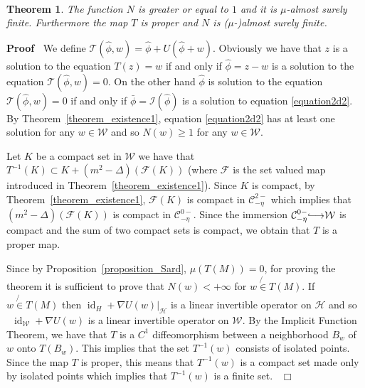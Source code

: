 \documentclass[a4paper,10pt]{article}
\newcommand{\longhookrightarrow}{{\lhook\joinrel\relbar\joinrel\rightarrow}}
\newcommand{\nobracket}{}
\newcommand{\tmop}[1]{\ensuremath{\operatorname{#1}}}
\newenvironment{proof}{\noindent\textbf{Proof\ }}{\hspace*{\fill}$\Box$\medskip}
\newtheorem{theorem}{Theorem}
\begin{document}
\

\begin{theorem}
  \label{theorem_weaksolution2}The function $N$ is greater or equal to $1$ and
  it is $\mu$-almost surely finite. Furthermore the map $T$ is proper and $N$
  is ($\mu$-)almost surely finite.
\end{theorem}

\begin{proof}
  We define $\mathcal{T} (\hat{\phi}, w) = \hat{\phi} + U (\hat{\phi} + w)$.
  Obviously we have that $z$ is a solution to the equation $T (z) = w$ if and
  only if $\hat{\phi} = z - w$ is a solution to the equation $\mathcal{T}
  (\hat{\phi}, w) = 0$. On the other hand $\hat{\phi}$ is solution to the
  equation $\mathcal{T} (\hat{\phi}, w) = 0$ if and only if $\bar{\phi}
  =\mathcal{I} (\hat{\phi})$ is a solution to equation {\eqref{equation2d2}}.
  By Theorem~\ref{theorem_existence1}, equation {\eqref{equation2d2}} has at
  least one solution for any $w \in \mathcal{W}$ and so $N (w) \geqslant 1$
  for any $w \in \mathcal{W}$.
  
  Let $K$ be a compact set in $\mathcal{W}$ we have that $T^{- 1} (K) \subset
  K + (m^2 - \Delta) (\mathcal{F} (K))$ (where $\mathcal{F}$ is the set valued
  map introduced in Theorem~\ref{theorem_existence1}). Since $K$ is compact,
  by Theorem~\ref{theorem_existence1}, $\mathcal{F} (K)$ is compact in
  $\mathcal{C}^{2 -}_{- \eta}$ which implies that $(m^2 - \Delta) (\mathcal{F}
  (K))$ is compact in $\mathcal{C}^{0 -}_{- \eta}$. Since the immersion
  $\mathcal{C}^{0 -}_{- \eta} \longhookrightarrow \mathcal{W}$ is compact and
  the sum of two compact sets is compact, we obtain that $T$ is a proper map.
  
  Since by Proposition~\ref{proposition_Sard}, $\mu (T (M)) = 0$, for proving
  the theorem it is sufficient to prove that $N (w) < + \infty$ for $w
  \not{\in} T (M)$. If $w \not{\in} T (M)$ then $\tmop{id}_H + \nobracket
  \nabla U (w) |_{\mathcal{H}}$ is a linear invertible operator on
  $\mathcal{H}$ and so \ $\tmop{id}_{\mathcal{W}} + \nabla U (w)$ is a linear
  invertible operator on $\mathcal{W}$. By the Implicit Function Theorem, we
  have that $T$ is a $C^1$ diffeomorphism between a neighborhood $B_w$ of $w$
  onto $T (B_w)$. This implies that the set $T^{- 1} (w)$ consists of isolated
  points. Since the map $T$ is proper, this means that $T^{- 1} (w)$ is a
  compact set made only by isolated points which implies that $T^{- 1} (w)$ is
  a finite set. \ 
\end{proof}
\end{document}
